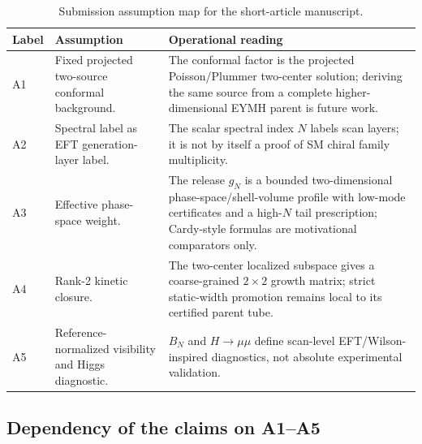 \documentclass[11pt,a4paper]{article}
\begin{document}
\begin{table}[htbp]
\centering
\caption{Submission assumption map for the short-article manuscript.}
\label{tab:assumptions}
\small
\setlength{\tabcolsep}{4pt}
\renewcommand{\arraystretch}{1.12}
\begin{tabular}{@{}l l l@{}}
\toprule
\parbox[t]{0.11\textwidth}{\raggedright \textbf{Label}} & \parbox[t]{0.36\textwidth}{\raggedright \textbf{Assumption}} & \parbox[t]{0.40\textwidth}{\raggedright \textbf{Operational reading}} \\
\midrule
\parbox[t]{0.11\textwidth}{\raggedright A1} & \parbox[t]{0.36\textwidth}{\raggedright Fixed projected two-source conformal background.} & \parbox[t]{0.40\textwidth}{\raggedright The conformal factor is the projected Poisson/Plummer two-center solution; deriving the same source from a complete higher-dimensional EYMH parent is future work.} \\
\parbox[t]{0.11\textwidth}{\raggedright A2} & \parbox[t]{0.36\textwidth}{\raggedright Spectral label as EFT generation-layer label.} & \parbox[t]{0.40\textwidth}{\raggedright The scalar spectral index \(N\) labels scan layers; it is not by itself a proof of SM chiral family multiplicity.} \\
\parbox[t]{0.11\textwidth}{\raggedright A3} & \parbox[t]{0.36\textwidth}{\raggedright Effective phase-space weight.} & \parbox[t]{0.40\textwidth}{\raggedright The release \(g_N\) is a bounded two-dimensional phase-space/shell-volume profile with low-mode certificates and a high-\(N\) tail prescription; Cardy-style formulas are motivational comparators only.} \\
\parbox[t]{0.11\textwidth}{\raggedright A4} & \parbox[t]{0.36\textwidth}{\raggedright Rank-2 kinetic closure.} & \parbox[t]{0.40\textwidth}{\raggedright The two-center localized subspace gives a coarse-grained \(2\times2\) growth matrix; strict static-width promotion remains local to its certified parent tube.} \\
\parbox[t]{0.11\textwidth}{\raggedright A5} & \parbox[t]{0.36\textwidth}{\raggedright Reference-normalized visibility and Higgs diagnostic.} & \parbox[t]{0.40\textwidth}{\raggedright \(B_N\) and \(H\to\mu\mu\) define scan-level EFT/Wilson-inspired diagnostics, not absolute experimental validation.} \\
\bottomrule
\end{tabular}
\end{table}

\subsection{Dependency of the claims on A1--A5}
\end{document}
